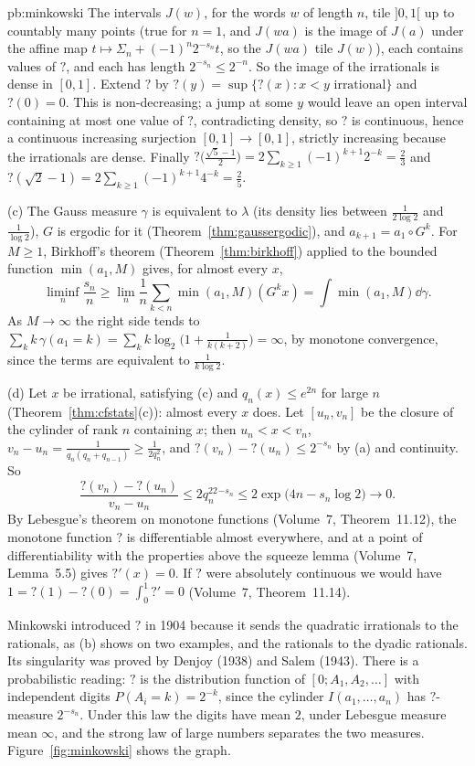 \begin{solution}{pb:minkowski}
The intervals $J(w)$, for the words $w$ of length $n$, tile $]0,1[$ up to countably many points (true for $n=1$, and $J(wa)$ is the image of $J(a)$ under the affine map
$t\mapsto\Sigma_n+(-1)^n2^{-s_n}t$, so the $J(wa)$ tile $J(w)$), each contains values of $?$, and each has length $2^{-s_n}\le2^{-n}$. So the image of the irrationals is
dense in $[0,1]$. Extend $?$ by $?(y)=\sup\{?(x):x<y\text{ irrational}\}$ and $?(0)=0$. This is non-decreasing; a jump at some $y$ would leave an open interval containing at
most one value of $?$, contradicting density, so $?$ is continuous, hence a continuous increasing surjection $[0,1]\to[0,1]$, strictly increasing because the
irrationals are dense. Finally $?\bigl(\frac{\sqrt5-1}2\bigr)=2\sum_{k\ge1}(-1)^{k+1}2^{-k}=\frac23$ and $?(\sqrt2-1)=2\sum_{k\ge1}(-1)^{k+1}4^{-k}=\frac25$.

(c) The Gauss measure $\gamma$ is equivalent to $\lambda$ (its density lies between $\frac1{2\log2}$ and $\frac1{\log2}$), $G$ is ergodic for it (Theorem~\ref{thm:gaussergodic}),
and $a_{k+1}=a_1\circ G^k$. For $M\ge1$, Birkhoff's theorem (Theorem~\ref{thm:birkhoff}) applied to the bounded function $\min(a_1,M)$ gives, for almost every $x$,
\[
\liminf_n\frac{s_n}n\ge\lim_n\frac1n\sum_{k<n}\min(a_1,M)(G^kx)=\int\min(a_1,M)\dd\gamma.
\]
As $M\to\infty$ the right side tends to $\sum_kk\,\gamma(a_1=k)=\sum_kk\log_2\bigl(1+\frac1{k(k+2)}\bigr)=\infty$, by monotone convergence, since the terms are
equivalent to $\frac1{k\log2}$.

(d) Let $x$ be irrational, satisfying (c) and $q_n(x)\le e^{2n}$ for large $n$ (Theorem~\ref{thm:cfstats}(c)): almost every $x$ does. Let $[u_n,v_n]$ be the closure of the
cylinder of rank $n$ containing $x$; then $u_n<x<v_n$, $v_n-u_n=\frac1{q_n(q_n+q_{n-1})}\ge\frac1{2q_n^2}$, and $?(v_n)-?(u_n)\le2^{-s_n}$ by (a) and continuity. So
\[
\frac{?(v_n)-?(u_n)}{v_n-u_n}\le2q_n^22^{-s_n}\le2\exp\bigl(4n-s_n\log2\bigr)\longrightarrow0.
\]
By Lebesgue's theorem on monotone functions (Volume~7, Theorem~11.12), the monotone function $?$ is differentiable almost everywhere, and at a point of differentiability with the properties above
the squeeze lemma (Volume~7, Lemma~5.5) gives $?'(x)=0$. If $?$ were absolutely continuous we would have $1=?(1)-?(0)=\int_0^1?'=0$ (Volume~7, Theorem~11.14).

\leads Minkowski introduced $?$ in 1904 because it sends the quadratic irrationals to the rationals, as (b) shows on two examples, and the rationals to the dyadic
rationals. Its singularity was proved by Denjoy (1938) and Salem (1943). There is a probabilistic reading: $?$ is the distribution function of $[0;A_1,A_2,\dots]$ with
independent digits $P(A_i=k)=2^{-k}$, since the cylinder $I(a_1,\dots,a_n)$ has $?$-measure $2^{-s_n}$. Under this law the digits have mean $2$, under Lebesgue measure
mean $\infty$, and the strong law of large numbers separates the two measures. Figure~\ref{fig:minkowski} shows the graph.
\end{solution}

